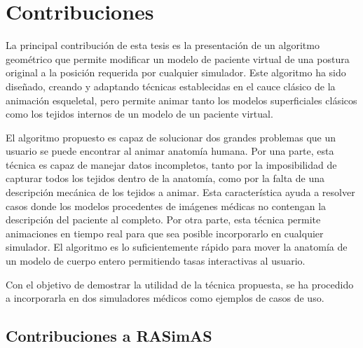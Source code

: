 \section{Contribuciones}
\label{intro:contribuciones}

La principal contribución de esta tesis es la presentación de un algoritmo geométrico que permite modificar un modelo de paciente virtual de una postura original a la posición requerida por cualquier simulador. Este algoritmo ha sido diseñado, creando y adaptando técnicas establecidas en el cauce clásico de la animación esqueletal, pero permite animar tanto los modelos superficiales clásicos como los tejidos internos de un modelo de un paciente virtual.

El algoritmo propuesto es capaz de solucionar dos grandes problemas que un usuario se puede encontrar al animar anatomía humana. Por una parte, esta técnica es capaz de manejar datos incompletos, tanto por la imposibilidad de capturar todos los tejidos dentro de la anatomía, %
como por la falta de una descripción mecánica de los tejidos a animar. Esta característica ayuda a resolver casos donde los modelos procedentes de imágenes médicas %
no contengan la descripción del paciente al completo. Por otra parte, esta técnica permite animaciones en tiempo real para que sea posible incorporarlo en cualquier simulador. El algoritmo es lo suficientemente rápido para mover la anatomía de un modelo de cuerpo entero permitiendo tasas interactivas al usuario.

Con el objetivo de demostrar la utilidad de la técnica propuesta, se ha procedido a incorporarla en dos simuladores médicos como ejemplos de casos de uso. 

\subsection{Contribuciones a RASimAS}



